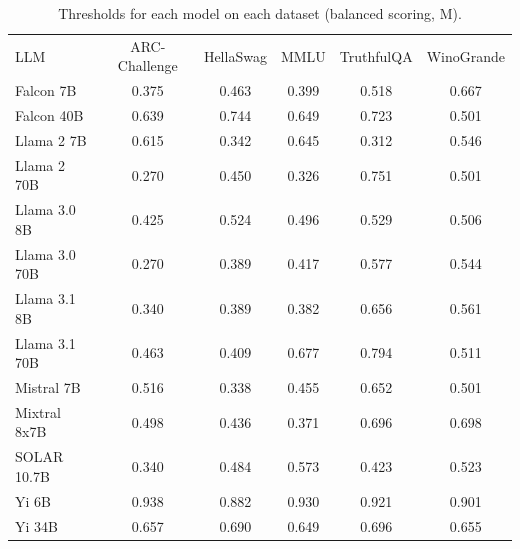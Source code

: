 \begin{table}[h]
\caption{Thresholds for each model on each dataset (balanced scoring, M). }
\label{tab:thresholds_prob_max_k20_w1}
\centering
\begin{tabular}{l S[table-format=3.1] S[table-format=3.1] S[table-format=3.1] S[table-format=3.1] S[table-format=3.1]}
\toprule
LLM & ARC-Challenge & HellaSwag & MMLU & TruthfulQA & WinoGrande \\ 
\cmidrule(lr){1-1} \cmidrule(lr){2-2} \cmidrule(lr){3-3} \cmidrule(lr){4-4} \cmidrule(lr){5-5} \cmidrule(lr){6-6}
Falcon 7B & 0.375 & 0.463 & 0.399 & 0.518 & 0.667\\
Falcon 40B & 0.639 & 0.744 & 0.649 & 0.723 & 0.501\\
Llama 2 7B & 0.615 & 0.342 & 0.645 & 0.312 & 0.546\\
Llama 2 70B & 0.270 & 0.450 & 0.326 & 0.751 & 0.501\\
Llama 3.0 8B & 0.425 & 0.524 & 0.496 & 0.529 & 0.506\\
Llama 3.0 70B & 0.270 & 0.389 & 0.417 & 0.577 & 0.544\\
Llama 3.1 8B & 0.340 & 0.389 & 0.382 & 0.656 & 0.561\\
Llama 3.1 70B & 0.463 & 0.409 & 0.677 & 0.794 & 0.511\\
Mistral 7B & 0.516 & 0.338 & 0.455 & 0.652 & 0.501\\
Mixtral 8x7B & 0.498 & 0.436 & 0.371 & 0.696 & 0.698\\
SOLAR 10.7B & 0.340 & 0.484 & 0.573 & 0.423 & 0.523\\
Yi 6B & 0.938 & 0.882 & 0.930 & 0.921 & 0.901\\
Yi 34B & 0.657 & 0.690 & 0.649 & 0.696 & 0.655\\
\bottomrule
\end{tabular}
\end{table}
